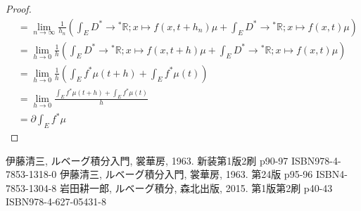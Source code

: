 \documentclass[dvipdfmx]{jsarticle}
\begin{document}
\begin{proof}
\begin{align*}
&= \lim_{n \rightarrow \infty}{\frac{1}{h_{n}}\left( \int_{E} {D^{*} \rightarrow{}^{*}\mathbb{R};x \mapsto f\left( x,t + h_{n} \right)\mu} + \int_{E} {D^{*} \rightarrow{}^{*}\mathbb{R};x \mapsto f(x,t)\mu} \right)}\\
&= \lim_{h \rightarrow 0}{\frac{1}{h}\left( \int_{E} {D^{*} \rightarrow{}^{*}\mathbb{R};x \mapsto f(x,t + h)\mu} + \int_{E} {D^{*} \rightarrow{}^{*}\mathbb{R};x \mapsto f(x,t)\mu} \right)}\\
&= \lim_{h \rightarrow 0}{\frac{1}{h}\left( \int_{E} {f^{*}\mu}(t + h) + \int_{E} {f^{*}\mu}(t) \right)}\\
&= \lim_{h \rightarrow 0}\frac{\int_{E} {f^{*}\mu}(t + h) + \int_{E} {f^{*}\mu}(t)}{h}\\
&= \partial\int_{E} {f^{*}\mu}
\end{align*}
\end{proof}
\begin{thebibliography}{50}
  伊藤清三, ルベーグ積分入門, 裳華房, 1963. 新装第1版2刷 p90-97 ISBN978-4-7853-1318-0
  伊藤清三, ルベーグ積分入門, 裳華房, 1963. 第24版 p95-96 ISBN4-7853-1304-8
  岩田耕一郎, ルベーグ積分, 森北出版, 2015. 第1版第2刷 p40-43 ISBN978-4-627-05431-8
\end{thebibliography}
\end{document}

